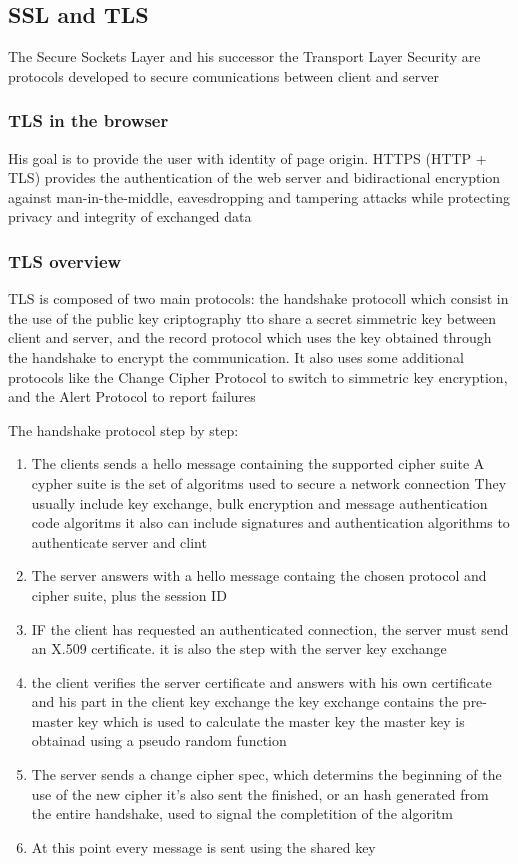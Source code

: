\documentclass[12pt, a4paper]{article}
\begin{document}
\subsection{SSL and TLS}
The Secure Sockets Layer and his successor the Transport Layer Security are protocols developed to secure
comunications between client and server

\subsubsection{TLS in the browser}
His goal is to provide the user with identity of page origin. HTTPS (HTTP + TLS) provides the authentication
of the web server and bidiractional encryption against man-in-the-middle, eavesdropping and tampering attacks
while protecting privacy and integrity of exchanged data

\subsubsection{TLS overview}
TLS is composed of two main protocols: the handshake protocoll which consist in the use of the public key
criptography tto share a secret simmetric key between client and server, and the record protocol which uses
the key obtained through the handshake to encrypt the communication. It also uses some additional protocols 
like the Change Cipher Protocol to switch to simmetric key encryption, and the Alert Protocol to report 
failures

The handshake protocol step by step:
\begin{enumerate}
    \item The clients sends a hello message containing the supported cipher suite
    \subitem A cypher suite is the set of algoritms used to secure a network connection
    \subsubitem They usually include key exchange, bulk encryption and message authentication code algoritms
    \subsubitem it also can include signatures and authentication algorithms to authenticate server and clint 
    \item The server answers with a hello message containg the chosen protocol and cipher suite, plus the session ID 
    \item IF the client has requested an authenticated connection, the server must send an X.509 certificate.
    \subitem it is also the step with the server key exchange
    \item the client verifies the server certificate and answers with his own certificate and his part in the
    client key exchange
    \subitem the key exchange contains the pre-master key which is used to calculate the master key
    \subitem the master key is obtainad using a pseudo random function 
    \item The server sends a change cipher spec, which determins the beginning of the use of the new cipher
    \subitem it's also sent the finished, or an hash generated from the entire handshake, used to signal the
    completition of the algoritm
    \item At this point every message is sent using the shared key
\end{enumerate}
\end{document}
